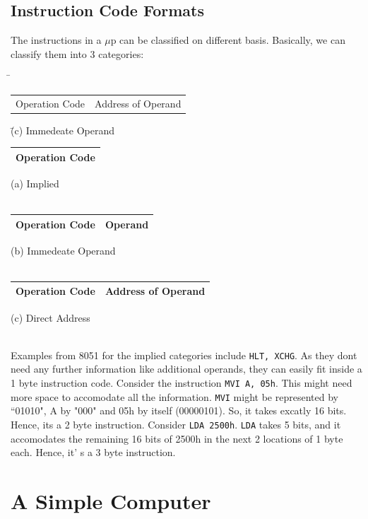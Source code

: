 \documentclass{book}
\begin{document}
\subsection{Instruction Code Formats}
\label{n_byte_ins}
The instructions in a $\mu$p can be classified on different basis. Basically, we
can classify them into 3 categories:\\
\begin{tabbing}
\hspace{1cm}\= 	\begin{tabular}{|c|c|}
	
		\hline
		Operation Code & Address of Operand

		\hline 
	       \end{tabular} \= (c) Immedeate Operand\kill

	    \>	\begin{tabular}{|c|}
		\hline
		Operation Code \\
		\hline 
	       \end{tabular} \> (a) Implied \\ \\
	    \> \begin{tabular}{|c|c|}
		\hline
		Operation Code & Operand \\
		\hline 
	       \end{tabular} \>  (b) Immedeate Operand \\ \\
	    \> \begin{tabular}{|c|c|}	
		\hline
		Operation Code & Address of Operand \\
		\hline 
	       \end{tabular} \>  (c) Direct Address \\ \\
\end{tabbing}

Examples from 8051 for the implied categories include \texttt{HLT, XCHG}. As
they dont need any further information like additional operands, they can easily
fit inside a 1 byte instruction code. Consider the instruction \texttt{MVI A,
05h}.  This might need more space to accomodate all the information.
\texttt{MVI} might be represented by ``01010", A by "000" and 05h by itself
(00000101). So, it takes excatly 16 bits. Hence, its a 2 byte instruction.
Consider \texttt{LDA 2500h}. \texttt{LDA} takes 5 bits, and it accomodates the
remaining 16 bits of 2500h in the next 2 locations of 1 byte each. Hence, it\rq
s a 3 byte instruction.

\section{A Simple Computer}
\end{document}

